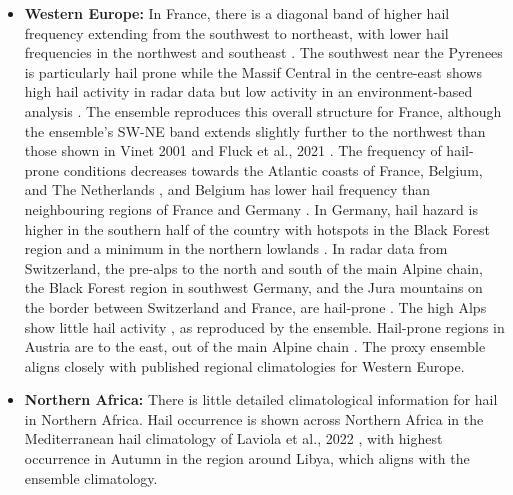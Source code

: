 \documentclass[pdflatex, sn-nature]{sn-jnl}\usepackage[]{graphicx}\usepackage[]{xcolor}
\begin{document}
\begin{itemize}
    \item \textbf{Western Europe:} In France, there is a diagonal band of higher
    hail frequency extending from the southwest to northeast, with lower hail
    frequencies in the northwest and southeast
    \citep{Vinet_AR_2001,Fluck_NHESS_2021,Mohr_AR_2013,Cui_JGRA_2025}. The
    southwest near the Pyrenees is particularly hail prone
    \citep{Vinet_AR_2001,Berthet_AR_2011, Berthet_AR_2013} while the Massif
    Central in the centre-east shows high hail activity in radar data
    \citep{Fluck_NHESS_2021} but low activity in an environment-based analysis
    \citep{Mohr_AR_2013}. The ensemble reproduces this overall structure for
    France, although the ensemble's SW-NE band extends slightly further to the
    northwest than those shown in Vinet 2001 \cite{Vinet_AR_2001} and Fluck et
    al., 2021 \cite{Fluck_NHESS_2021}. The frequency of hail-prone conditions
    decreases towards the Atlantic coasts of France, Belgium, and The
    Netherlands \citep{Mohr_GRL_2015, Punge_AR_2016}, and Belgium has lower hail
    frequency than neighbouring regions of France and Germany
    \citep{Lukach_MA_2017, Fluck_NHESS_2021}. In Germany, hail hazard is higher
    in the southern half of the country
    \citep{Mohr_GRL_2015, Fluck_NHESS_2021, Suwala_QG_2013, Cui_JGRA_2025, Punge_AR_2016}
    with hotspots in the Black Forest region \citep{Fluck_NHESS_2021,
    Suwala_QG_2013, Nisi_QJRMS_2016} and a minimum in the northern lowlands
    \citep{Suwala_QG_2013}. In radar data from Switzerland, the pre-alps to the
    north and south of the main Alpine chain, the Black Forest region in
    southwest Germany, and the Jura mountains on the border between Switzerland
    and France, are hail-prone \citep{Nisi_QJRMS_2016}. The high Alps show
    little hail activity \citep{Mohr_GRL_2015, Nisi_QJRMS_2016,
    Kahraman_MWR_2016, Punge_AR_2016}, as reproduced by the ensemble. Hail-prone
    regions in Austria are to the east, out of the main Alpine chain
    \citep{Svabki_ECSS_2013,Punge_AR_2016}. The proxy ensemble aligns closely
    with published regional climatologies for Western Europe.

    \item \textbf{Northern Africa:} There is little detailed climatological
    information for hail in Northern Africa. Hail occurrence is shown across
    Northern Africa in the Mediterranean hail climatology of Laviola et al.,
    2022 \cite{Laviola_RS_2022}, with highest occurrence in Autumn in the region
    around Libya, which aligns with the ensemble climatology.
    

\end{itemize}
\end{document}
